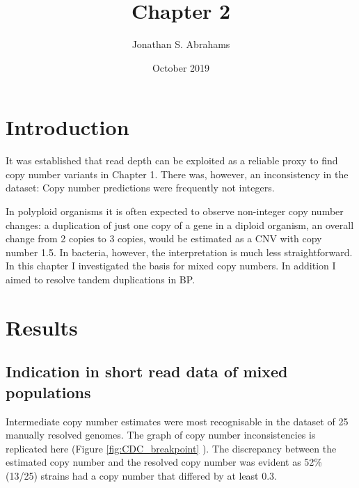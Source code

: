 \documentclass{article}
\title{Chapter 2}
\author{Jonathan S. Abrahams }
\date{October 2019}
\begin{document}
\maketitle

\section{Introduction}
It was established that read depth can be exploited as a reliable proxy to find copy number variants in Chapter 1. There was, however, an inconsistency in the dataset: Copy number predictions were frequently not integers. 

In polyploid organisms it is often expected to observe non-integer copy number changes: a duplication of just one copy of a gene in a diploid organism, an overall change from 2 copies to 3 copies, would be estimated as a CNV with copy number 1.5. In bacteria, however, the interpretation is much less straightforward. In this chapter I investigated the basis for mixed copy numbers. In addition I aimed to resolve tandem duplications in BP.

\section{Results}

\subsection{Indication in short read data of mixed populations}



Intermediate copy number estimates were most recognisable in the dataset of 25 manually resolved genomes. The graph of copy number inconsistencies is replicated here (Figure \ref{fig:CDC_breakpoint} ). The discrepancy between the estimated copy number and the resolved copy number was evident as 52\% (13/25) strains had a copy number that differed by at least 0.3. 
\end{document}

